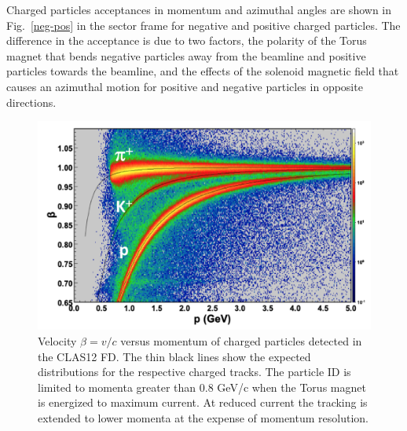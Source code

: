 \documentclass[final,3p,times,twocolumn,authoryear]{elsarticle}
\begin{document}
 Charged particles acceptances in momentum and azimuthal angles are shown in Fig.~\ref{neg-pos} in the sector frame for negative and positive charged particles. The difference in the acceptance is due to two factors, the polarity of the Torus magnet that bends negative particles away from the beamline and positive particles towards the beamline, and the effects of the solenoid magnetic field that causes an azimuthal motion for positive and negative particles in opposite directions. 
\begin{figure}[htbp!]
\centerline{\includegraphics[width=1.1\columnwidth]{FTOF1b_pid.png}}
\caption{Velocity $\beta = v/c $ versus momentum of charged particles detected in the CLAS12 FD. The thin black lines show the expected distributions
for the respective charged tracks. The particle ID is limited to momenta greater than 0.8 GeV/c when the Torus magnet is energized to maximum 
current. At reduced current the tracking is extended to lower momenta at the expense of momentum resolution. }
\label{pid}
\end{figure} 
\end{document}

